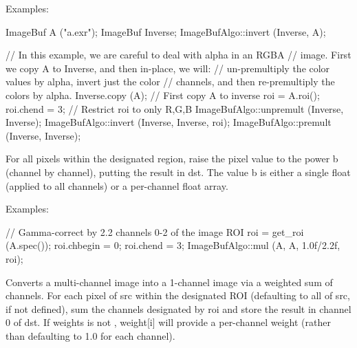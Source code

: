 \smallskip
\noindent Examples:
\begin{code}
    ImageBuf A ("a.exr");
    ImageBuf Inverse;
    ImageBufAlgo::invert (Inverse, A);

    // In this example, we are careful to deal with alpha in an RGBA
    // image. First we copy A to Inverse, and then in-place, we will:
    // un-premultiply the color values by alpha, invert just the color
    // channels, and then re-premultiply the colors by alpha.
    Inverse.copy (A);   // First copy A to inverse
    roi = A.roi();
    roi.chend = 3;      // Restrict roi to only R,G,B
    ImageBufAlgo::unpremult (Inverse, Inverse);
    ImageBufAlgo::invert (Inverse, Inverse, roi);
    ImageBufAlgo::premult (Inverse, Inverse);
\end{code}

\apiend


 

For all pixels within the designated region, raise the pixel value to the
power {\cf b} (channel by channel), putting the result in
{\cf dst}.  The value {\cf b} is either a single 
float (applied to all channels) or a per-channel float array.

\smallskip
\noindent Examples:
\begin{code}
    // Gamma-correct by 2.2 channels 0-2 of the image
    ROI roi = get_roi (A.spec());
    roi.chbegin = 0;  roi.chend = 3;
    ImageBufAlgo::mul (A, A, 1.0f/2.2f, roi);
\end{code}
\apiend


 
Converts a multi-channel image into a 1-channel image via a weighted sum
of channels.  For each pixel of {\cf src} within the designated ROI
(defaulting to all of {\cf src}, if not defined), sum the channels
designated by {\cf roi} and store the result in channel 0 of {\cf dst}.
If {\cf weights} is not \NULL, {\cf weight[i]} will provide a
per-channel weight (rather than defaulting to 1.0 for each channel).

